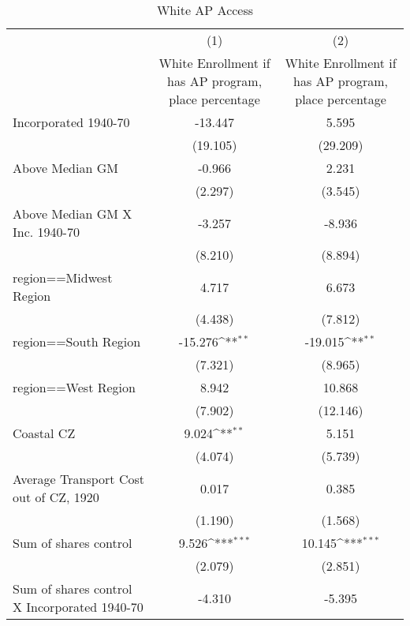\begin{table}[htbp]\centering
\def\sym#1{\ifmmode^{#1}\else\(^{#1}\)\fi}
\caption{White AP Access}
\begin{tabular}{l*{2}{c}}
\hline\hline
                    &\multicolumn{1}{c}{(1)}&\multicolumn{1}{c}{(2)}\\
                    &\multicolumn{1}{c}{White Enrollment if has AP program, place percentage}&\multicolumn{1}{c}{White Enrollment if has AP program, place percentage}\\
\hline
Incorporated 1940-70&     -13.447         &       5.595         \\
                    &    (19.105)         &    (29.209)         \\
[1em]
Above Median GM     &      -0.966         &       2.231         \\
                    &     (2.297)         &     (3.545)         \\
[1em]
Above Median GM X Inc. 1940-70&      -3.257         &      -8.936         \\
                    &     (8.210)         &     (8.894)         \\
[1em]
region==Midwest Region&       4.717         &       6.673         \\
                    &     (4.438)         &     (7.812)         \\
[1em]
region==South Region&     -15.276\sym{**} &     -19.015\sym{**} \\
                    &     (7.321)         &     (8.965)         \\
[1em]
region==West Region &       8.942         &      10.868         \\
                    &     (7.902)         &    (12.146)         \\
[1em]
Coastal CZ          &       9.024\sym{**} &       5.151         \\
                    &     (4.074)         &     (5.739)         \\
[1em]
Average Transport Cost out of CZ, 1920&       0.017         &       0.385         \\
                    &     (1.190)         &     (1.568)         \\
[1em]
Sum of shares control&       9.526\sym{***}&      10.145\sym{***}\\
                    &     (2.079)         &     (2.851)         \\
[1em]
Sum of shares control X Incorporated 1940-70&      -4.310         &      -5.395         \\

\end{tabular}
\end{table}
